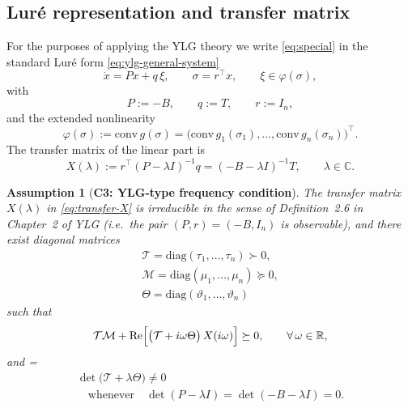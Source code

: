 \documentclass[journal]{IEEEtran}
\newtheorem{assumption}{Assumption}
\begin{document}
\subsection*{Lur\'e representation and transfer matrix}

For the purposes of applying the YLG theory we write
\eqref{eq:special} in the standard Lur\'e form \eqref{eq:ylg-general-system}
\begin{equation}\label{eq:lure-Pqr}
  \dot x = P x + q\,\xi, 
  \qquad \sigma = r^{\top}x, 
  \qquad \xi \in \varphi(\sigma),
\end{equation}
with
\begin{equation}\label{eq:Pqr-def}
  P := -B,\qquad
  q := T,\qquad
  r := I_n,
\end{equation}
and the extended nonlinearity
\[
  \varphi(\sigma)
  := \mathrm{conv}\,g(\sigma)
  = \bigl(\mathrm{conv}\,g_1(\sigma_1),\dots,
          \mathrm{conv}\,g_n(\sigma_n)\bigr)^\top .
\]
The transfer matrix of the linear part is
\begin{equation}\label{eq:transfer-X}
  X(\lambda) 
  := r^{\top}(P-\lambda I)^{-1}q
  = (-B-\lambda I)^{-1}T,
  \qquad \lambda\in\mathbb{C}.
\end{equation}

\begin{assumption}[\bf C3: YLG-type frequency condition]\label{ass:C3prime}
The transfer matrix $X(\lambda)$ in \eqref{eq:transfer-X} is
irreducible in the sense of Definition~2.6 in Chapter~2 of YLG
(i.e.\ the pair $(P,r)=(-B,I_n)$ is observable), and there exist
diagonal matrices
\begin{multline*}   
   \mathcal{T}=\mathrm{diag}(\tau_1,\dots,\tau_n)\succ 0,\\
   \mathcal{M}=\mathrm{diag}(\mu_1,\dots,\mu_n)\succeq 0,\\
   \Theta=\mathrm{diag}(\vartheta_1,\dots,\vartheta_n)
\end{multline*}
such that
\begin{equation}\label{eq:C3prime-freq}
   \mathcal{T}\mathcal{M}
   + \operatorname{Re}\Bigl[
        \bigl(\mathcal{T} + i\omega \Theta\bigr)\,
        X(i\omega)
      \Bigr]
   \succeq 0,
   \qquad \forall\,\omega\in\mathbb{R},
\end{equation}
and
=
\begin{multline}\label{eq:C3prime-det}
    \det\bigl(\mathcal{T} + \lambda \Theta\bigr) \neq 0 \\ 
  \quad\text{whenever}\quad 
  \det(P-\lambda I)=\det(-B-\lambda I)=0.
\end{multline}
\end{assumption}
\end{document}
